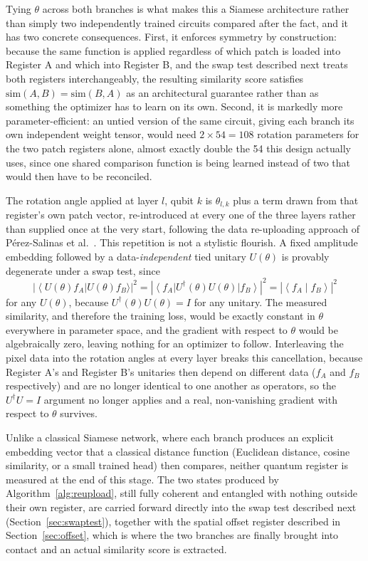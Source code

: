 \documentclass[conference]{IEEEtran}
\newcommand{\ket}[1]{\left|#1\right\rangle}
\newcommand{\bra}[1]{\left\langle#1\right|}
\newcommand{\braket}[2]{\left\langle#1\middle|#2\right\rangle}
\begin{document}
Tying $\theta$ across both branches is what makes this a Siamese architecture rather than simply two independently trained circuits compared after the fact, and it has two concrete consequences. First, it enforces symmetry by construction: because the same function is applied regardless of which patch is loaded into Register A and which into Register B, and the swap test described next treats both registers interchangeably, the resulting similarity score satisfies $\mathrm{sim}(A,B) = \mathrm{sim}(B,A)$ as an architectural guarantee rather than as something the optimizer has to learn on its own. Second, it is markedly more parameter-efficient: an untied version of the same circuit, giving each branch its own independent weight tensor, would need $2\times54 = 108$ rotation parameters for the two patch registers alone, almost exactly double the 54 this design actually uses, since one shared comparison function is being learned instead of two that would then have to be reconciled.

The rotation angle applied at layer $l$, qubit $k$ is $\theta_{l,k}$ plus a term drawn from that register's own patch vector, re-introduced at every one of the three layers rather than supplied once at the very start, following the data re-uploading approach of P\'erez-Salinas et al.~\cite{reuploading2020}. This repetition is not a stylistic flourish. A fixed amplitude embedding followed by a data-\emph{independent} tied unitary $U(\theta)$ is provably degenerate under a swap test, since
\begin{equation}
\left|\bra{U(\theta)f_A}U(\theta)f_B\rangle\right|^2
= \left|\bra{f_A}U^\dagger(\theta)U(\theta)\ket{f_B}\right|^2
= \left|\braket{f_A}{f_B}\right|^2
\label{eq:degenerate}
\end{equation}
for any $U(\theta)$, because $U^\dagger(\theta)U(\theta) = I$ for any unitary. The measured similarity, and therefore the training loss, would be exactly constant in $\theta$ everywhere in parameter space, and the gradient with respect to $\theta$ would be algebraically zero, leaving nothing for an optimizer to follow. Interleaving the pixel data into the rotation angles at every layer breaks this cancellation, because Register A's and Register B's unitaries then depend on different data ($f_A$ and $f_B$ respectively) and are no longer identical to one another as operators, so the $U^\dagger U = I$ argument no longer applies and a real, non-vanishing gradient with respect to $\theta$ survives.

Unlike a classical Siamese network, where each branch produces an explicit embedding vector that a classical distance function (Euclidean distance, cosine similarity, or a small trained head) then compares, neither quantum register is measured at the end of this stage. The two states produced by Algorithm~\ref{alg:reupload}, still fully coherent and entangled with nothing outside their own register, are carried forward directly into the swap test described next (Section~\ref{sec:swaptest}), together with the spatial offset register described in Section~\ref{sec:offset}, which is where the two branches are finally brought into contact and an actual similarity score is extracted.
\end{document}
